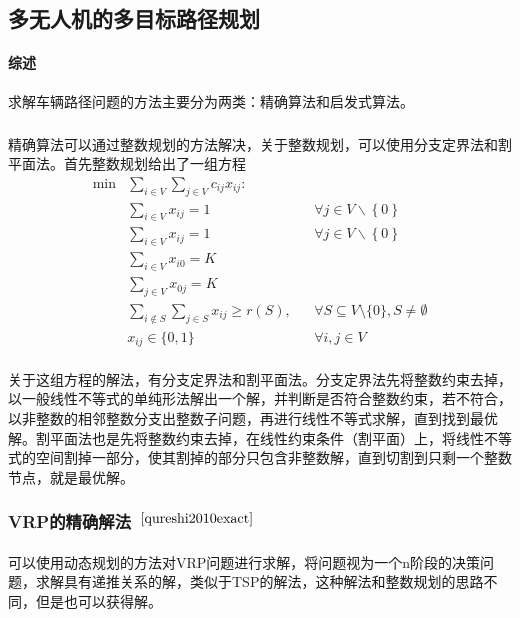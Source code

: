 \documentclass[UTF8,a4paper]{ctexart}
\begin{document}
\subsection{多无人机的多目标路径规划}\label{sec:vrp}
\paragraph{综述}求解车辆路径问题的方法主要分为两类：精确算法和启发式算法。
\subparagraph{}精确算法可以通过整数规划的方法解决，关于整数规划，可以使用分支定界法和割平面法。首先整数规划给出了一组方程
\begin{align*}
    \min & \sum_{i\in V}\sum_{j \in V}c_{ij}x_{ij}\colon   &  &                                                     \\
         & \sum _{i\in V}x_{ij}=1                          &  & \forall j\in V\backslash \left\{0\right\}           \\
         & \sum _{i\in V}x_{ij}=1                          &  & \forall j\in V\backslash \left\{0\right\}           \\
         & \sum _{i\in V}x_{i0}=K                          &  &                                                     \\
         & \sum _{j\in V}x_{0j}=K                          &  &                                                     \\
         & \sum _{i\notin S}\sum _{j\in S}x_{ij}\geq r(S), &  & \forall S\subseteq V\setminus \{0\},S\neq \emptyset \\
         & x_{ij}\in \{0,1\}                               &  & \forall i,j\in V
\end{align*}
\paragraph{}关于这组方程的解法，有分支定界法和割平面法。分支定界法先将整数约束去掉，以一般线性不等式的单纯形法解出一个解，并判断是否符合整数约束，若不符合，以非整数的相邻整数分支出整数子问题，再进行线性不等式求解，直到找到最优解。割平面法也是先将整数约束去掉，在线性约束条件（割平面）上，将线性不等式的空间割掉一部分，使其割掉的部分只包含非整数解，直到切割到只剩一个整数节点，就是最优解。
\subsubsection{VRP的精确解法~$^{\cite{qureshi2010exact}}$}
\paragraph{}可以使用动态规划的方法对VRP问题进行求解，将问题视为一个n阶段的决策问题，求解具有递推关系的解，类似于TSP的解法，这种解法和整数规划的思路不同，但是也可以获得解。
\end{document}
